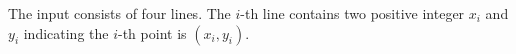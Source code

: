 The input consists of four lines.
The $i$-th line contains two positive integer $x_i$ and $y_i$ indicating the $i$-th point is $(x_i,y_i)$.
